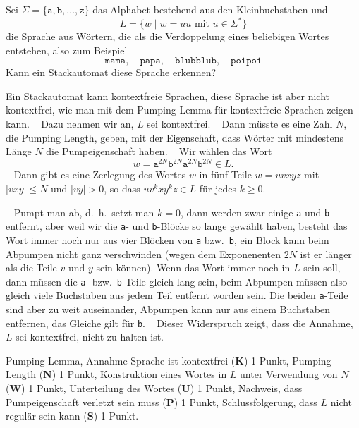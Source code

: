 Sei $\Sigma=\{\texttt{a},\texttt{b},\dots,\texttt{z}\}$ das Alphabet
bestehend aus den Kleinbuchstaben und 
\[
L=\{ w\;|\; \text{$w=uu$ mit $u\in\Sigma^*$}\}
\]
die Sprache aus Wörtern, die als die Verdoppelung eines beliebigen
Wortes entstehen, also zum Beispiel
\[
\texttt{mama},\quad
\texttt{papa},\quad
\texttt{blubblub},\quad
\texttt{poipoi}
\]
Kann ein Stackautomat diese Sprache erkennen?


\begin{loesung}
Ein Stackautomat kann kontextfreie Sprachen, diese Sprache ist aber nicht
kontextfrei, wie man mit dem Pumping-Lemma für kontextfreie
Sprachen zeigen kann.
~%
Dazu nehmen wir an, $L$ sei kontextfrei.
~%
Dann müsste es eine Zahl $N$, die Pumping Length, geben, mit der Eigenschaft,
dass Wörter mit mindestens Länge $N$ die Pumpeigenschaft haben.
~%
Wir wählen das Wort
\[
w=
\texttt{a}^{2N}
\texttt{b}^{2N}
\texttt{a}^{2N}
\texttt{b}^{2N}
\in L.
\]
~%
Dann gibt es eine Zerlegung des Wortes $w$ in fünf Teile $w=uvxyz$ mit
$|vxy|\le N$ und $|vy|>0$, so dass $uv^kxy^kz\in L$ für jedes $k\ge 0$.

~%
Pumpt man ab, d.~h.~setzt man $k=0$, dann werden zwar einige \texttt{a}
und \texttt{b} entfernt, aber weil wir die \texttt{a}- und \texttt{b}-Blöcke
so lange gewählt haben, besteht das Wort immer noch nur aus
vier Blöcken von \texttt{a} bzw.~\texttt{b}, ein Block kann beim
Abpumpen nicht ganz verschwinden (wegen dem Exponenenten $2N$ ist er
länger als die Teile $v$ und $y$ sein können).
Wenn das Wort immer noch in $L$ sein soll, dann müssen die \texttt{a}-
bzw.~\texttt{b}-Teile gleich lang sein, beim Abpumpen müssen also
gleich viele Buchstaben aus jedem Teil entfernt worden sein.
Die beiden \texttt{a}-Teile sind aber zu weit auseinander, Abpumpen
kann nur aus einem Buchstaben entfernen, das Gleiche gilt für \texttt{b}.
~%
Dieser Widerspruch zeigt, dass die Annahme, $L$ sei kontextfrei, nicht
zu halten ist.
\end{loesung}

\begin{bewertung}
Pumping-Lemma, Annahme Sprache ist kontextfrei ({\bf K}) 1 Punkt,
Pumping-Length ({\bf N}) 1 Punkt,
Konstruktion eines Wortes in $L$ unter Verwendung von $N$ ({\bf W}) 1 Punkt,
Unterteilung des Wortes ({\bf U}) 1 Punkt,
Nachweis, dass Pumpeigenschaft verletzt sein muss ({\bf P}) 1 Punkt,
Schlussfolgerung, dass $L$ nicht regulär sein kann ({\bf S}) 1 Punkt.
\end{bewertung}




